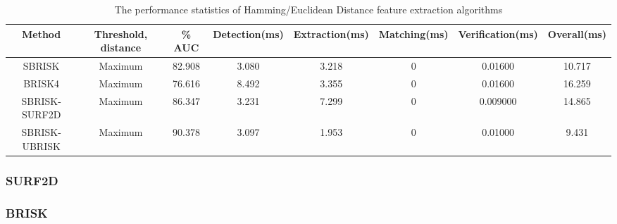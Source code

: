 \documentclass{article}
\begin{document}
\begin{table}
\caption{The performance statistics of Hamming/Euclidean Distance feature extraction algorithms}
\begin{tabular}{|c|c|c|c|c|c|c|c|}
\hline 
Method & Threshold, distance & \% AUC & Detection(ms) & Extraction(ms) & Matching(ms) & Verification(ms) & Overall(ms)\tabularnewline
\hline 
\hline 
SBRISK & Maximum & 82.908 & 3.080 & 3.218 & 0 & 0.01600 & 10.717\tabularnewline
\hline 
BRISK4 & Maximum & 76.616 & 8.492 & 3.355 & 0 & 0.01600 & 16.259\tabularnewline
\hline 
SBRISK-SURF2D & Maximum & 86.347 & 3.231 & 7.299 & 0 & 0.009000 & 14.865\tabularnewline
\hline 
SBRISK-UBRISK & Maximum & 90.378 & 3.097 & 1.953 & 0 & 0.01000 & 9.431\tabularnewline
\hline 
\end{tabular}

\label{tab:hammingStatistics}
\end{table}





\subsubsection{SURF2D}
\label{sec:2dsurfResults}

\subsubsection{BRISK}
\label{sec:briskResults}


\end{document}
